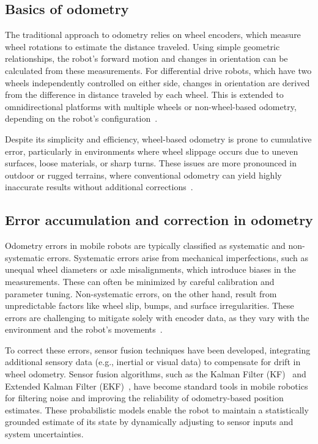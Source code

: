 \subsection{Basics of odometry}

The traditional approach to odometry relies on wheel encoders, which measure wheel rotations to estimate the distance traveled. Using simple geometric relationships, the robot’s forward motion and changes in orientation can be calculated from these measurements. For differential drive robots, which have two wheels independently controlled on either side, changes in orientation are derived from the difference in distance traveled by each wheel. This is extended to omnidirectional platforms with multiple wheels or non-wheel-based odometry, depending on the robot's configuration~\cite{odometry_1996}.

Despite its simplicity and efficiency, wheel-based odometry is prone to cumulative error, particularly in environments where wheel slippage occurs due to uneven surfaces, loose materials, or sharp turns. These issues are more pronounced in outdoor or rugged terrains, where conventional odometry can yield highly inaccurate results without additional corrections~\cite{odometry_1996}.

\subsection{Error accumulation and correction in odometry}

Odometry errors in mobile robots are typically classified as systematic and non-systematic errors. Systematic errors arise from mechanical imperfections, such as unequal wheel diameters or axle misalignments, which introduce biases in the measurements. These can often be minimized by careful calibration and parameter tuning. Non-systematic errors, on the other hand, result from unpredictable factors like wheel slip, bumps, and surface irregularities. These errors are challenging to mitigate solely with encoder data, as they vary with the environment and the robot’s movements~\cite{odometry_1996}.

To correct these errors, sensor fusion techniques have been developed, integrating additional sensory data (e.g., inertial or visual data) to compensate for drift in wheel odometry. Sensor fusion algorithms, such as the Kalman Filter (KF)~\cite{kalman1960} and Extended Kalman Filter (EKF)~\cite{extended_kalman_filter}, have become standard tools in mobile robotics for filtering noise and improving the reliability of odometry-based position estimates. These probabilistic models enable the robot to maintain a statistically grounded estimate of its state by dynamically adjusting to sensor inputs and system uncertainties.

